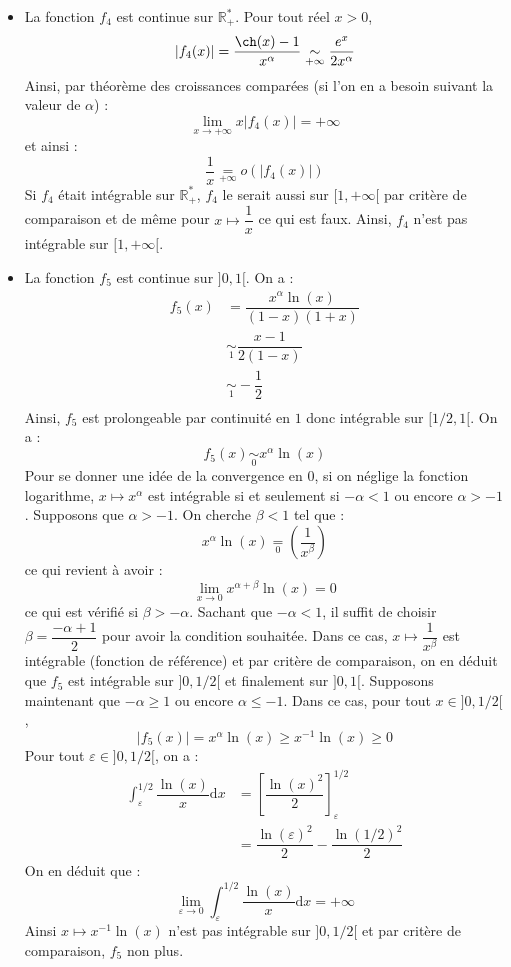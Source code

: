 \documentclass[a4paper,twoside,french,10pt]{VcCours}
\newcommand{\dx}{\text{d}x}
\begin{document}
\begin{itemize}
\item La fonction $f_4$ est continue sur $\mathbb{R}_+^*$. Pour tout réel $x>0$,
$$ \vert f_4(x) \vert = \dfrac{\ch(x)-1}{x^{\alpha}} \underset{+ \infty} {\sim}\dfrac{e^x}{2x^{\alpha}}$$
Ainsi, par théorème des croissances comparées (si l'on en a besoin suivant la valeur de $\alpha$) :
$$ \lim_{x \rightarrow + \infty} x \vert f_4(x) \vert = + \infty$$
et ainsi :
$$ \dfrac{1}{x} \underset{+\infty}{=} o (\vert f_4(x) \vert)$$
Si $f_4$ était intégrable sur $\mathbb{R}_+^{*}$, $f_4$ le serait aussi sur $[1, + \infty[$ par critère de comparaison et de même pour $x \mapsto \dfrac{1}{x}$ ce qui est faux. Ainsi, $f_4$ n'est pas intégrable sur $[1, + \infty[$.
\item La fonction $f_5$ est continue sur $]0,1[$. On a :
\begin{align*}
 f_5(x) & = \dfrac{x^{\alpha} \ln(x)}{(1-x)(1+x)} \\
 &  \underset{1}{\sim} \dfrac{x-1}{2(1-x)} \\
 &  \underset{1}{\sim} - \dfrac{1}{2} \\
 \end{align*}
 Ainsi, $f_5$ est prolongeable par continuité en $1$ donc intégrable sur $[1/2,1[$. On a :
 $$ f_5(x) \underset{0}{\sim} x^{\alpha} \ln(x)$$
Pour se donner une idée de la convergence en $0$, si on néglige la fonction logarithme, $x \mapsto x^{\alpha}$ est intégrable si et seulement si $- \alpha <1$ ou encore $\alpha>-1$. Supposons que $\alpha>-1$. On cherche $\beta <1$ tel que :
$$ x^{\alpha} \ln(x) \underset{0}{=} \left( \dfrac{1}{x^{\beta}} \right)$$
ce qui revient à avoir :
$$ \lim_{x \rightarrow 0} x^{\alpha+ \beta} \ln(x) = 0$$
ce qui est vérifié si $\beta > - \alpha$. Sachant que $-\alpha <1$, il suffit de choisir $\beta = \dfrac{-\alpha+1}{2}$ pour avoir la condition souhaitée. Dans ce cas, $x \mapsto \dfrac{1}{x^{\beta}}$ est intégrable (fonction de référence) et par critère de comparaison, on en déduit que $f_5$ est intégrable sur $]0,1/2[$ et finalement sur $]0,1[$. Supposons maintenant que $- \alpha \geq 1$ ou encore $\alpha \leq -1$. Dans ce cas, pour tout $x \in ]0,1/2[$,
$$ \vert f_5(x) \vert= x^{\alpha} \ln(x) \geq x^{-1} \ln(x) \geq 0$$
Pour tout $\varepsilon \in ]0,1/2[$, on a :
\begin{align*}
\int_{\varepsilon}^{1/2} \dfrac{\ln(x)}{x} \dx & = \left[ \dfrac{\ln(x)^2}{2} \right]_{\varepsilon}^{1/2} \\
& = \dfrac{\ln(\varepsilon)^2}{2} - \dfrac{\ln(1/2)^2}{2}
\end{align*}
On en déduit que :
$$ \lim_{\varepsilon \rightarrow 0}\int_{\varepsilon}^{1/2} \dfrac{\ln(x)}{x} \dx = + \infty$$
Ainsi $x \mapsto x^{-1} \ln(x)$ n'est pas intégrable sur $]0,1/2[$ et par critère de comparaison, $f_5$ non plus.


\end{itemize}
\end{document}
